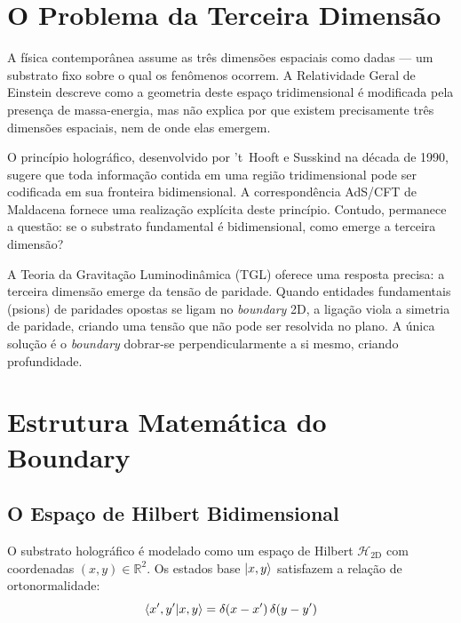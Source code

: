 \documentclass[12pt,a4paper,twoside]{article}
\newcommand{\boundary}{\textit{boundary}}
\begin{document}
\section{O Problema da Terceira Dimens\~ao}


A f\'isica contempor\^anea assume as tr\^es dimens\~oes espaciais como dadas --- um substrato fixo sobre o qual os fen\^omenos ocorrem. A Relatividade Geral de Einstein descreve como a geometria deste espa\c{c}o tridimensional \'e modificada pela presen\c{c}a de massa-energia, mas n\~ao explica por que existem precisamente tr\^es dimens\~oes espaciais, nem de onde elas emergem.

O princ\'ipio hologr\'afico, desenvolvido por 't~Hooft e Susskind na d\'ecada de 1990, sugere que toda informa\c{c}\~ao contida em uma regi\~ao tridimensional pode ser codificada em sua fronteira bidimensional. A correspond\^encia AdS/CFT de Maldacena fornece uma realiza\c{c}\~ao expl\'icita deste princ\'ipio. Contudo, permanece a quest\~ao: se o substrato fundamental \'e bidimensional, como emerge a terceira dimens\~ao?

A Teoria da Gravita\c{c}\~ao Luminodin\^amica (TGL) oferece uma resposta precisa: a terceira dimens\~ao emerge da tens\~ao de paridade. Quando entidades fundamentais (psions) de paridades opostas se ligam no \boundary{} 2D, a liga\c{c}\~ao viola a simetria de paridade, criando uma tens\~ao que n\~ao pode ser resolvida no plano. A \'unica solu\c{c}\~ao \'e o \boundary{} dobrar-se perpendicularmente a si mesmo, criando profundidade.


\section{Estrutura Matem\'atica do Boundary}


\subsection{O Espa\c{c}o de Hilbert Bidimensional}

O substrato hologr\'afico \'e modelado como um espa\c{c}o de Hilbert $\mathcal{H}_{2\text{D}}$ com coordenadas $(x, y) \in \mathbb{R}^2$. Os estados base $\ket{x, y}$ satisfazem a rela\c{c}\~ao de ortonormalidade:
\begin{equation}
\braket{x', y'}{x, y} = \delta(x - x')\,\delta(y - y')
\label{eq:ortonormalidade}
\end{equation}
\end{document}
